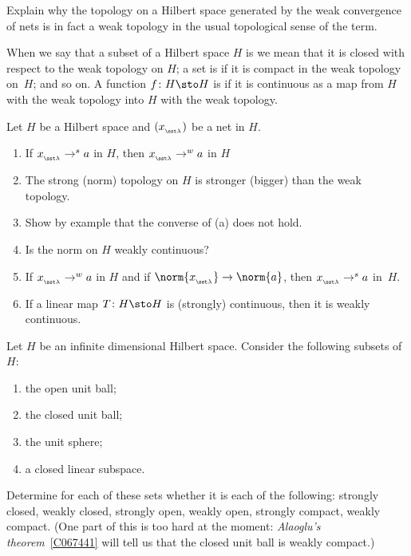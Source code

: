 \begin{exer} Explain why the topology on a Hilbert space generated by the weak convergence of nets is in fact a
weak topology in the usual topological sense of the term.
\end{exer}

When we say that a subset of a Hilbert space $H$ is
 we mean that it is closed with respect to the weak topology on $H$; a set is
 if it is compact in the weak topology on~$H$; and so on. A function
$f\colon H \sto H$ is
 if it is continuous as a map from $H$ with the weak topology into $H$
with the weak topology.

\begin{exer} Let $H$ be a Hilbert space and $(x_{{}_{\sst\lambda}})$ be a net in $H$.
 \begin{enumerate}
  \item If $x_{{}_{\sst\lambda}} \to^s  a$ in $H$, then $x_{{}_{\sst\lambda}} \to^w a$ in $H$
  \item The strong (norm) topology on $H$ is stronger (bigger) than the weak topology.
  \item Show by example that the converse of (a) does not hold.
  \item Is the norm on $H$ weakly continuous?
  \item If $x_{{}_{\sst\lambda}} \to^w  a$ in $H$ and if $\norm{x_{{}_{\sst\lambda}}} \to \norm{a}$, then
$x_{{}_{\sst\lambda}}\to^s a$ in~$H$.
  \item If a linear map $T\colon H \sto H$ is (strongly) continuous, then it is weakly continuous.
 \end{enumerate}
\end{exer}

\begin{exer} Let $H$ be an infinite dimensional Hilbert space. Consider the following subsets of~$H$:
 \begin{enumerate}[label=\rm{(\alph*)}]
  \item the open unit ball;
  \item the closed unit ball;
  \item the unit sphere;
  \item a closed linear subspace.
 \end{enumerate}
Determine for each of these sets whether it is each of the following: strongly closed, weakly
closed, strongly open, weakly open, strongly compact, weakly compact.  (One part of this is
too hard at the moment: \emph{Alaoglu's theorem}~\ref{C067441} will tell us that the
closed unit ball is weakly compact.)
\end{exer}

